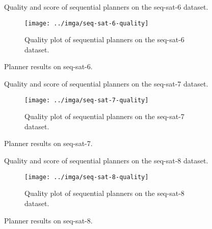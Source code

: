\begin{figure}[tbp]
\centering
\begin{subtable}{\textwidth}
\centering
\scriptsize
\renewcommand{\footnotesize}{\scriptsize}

\caption{Quality and score of sequential planners on the seq-sat-6 dataset.}
\label{tab:seq-sat-6-ipc-scores}
\end{subtable}

\vspace{0.5cm}
\begin{subfigure}{\textwidth}
\centering
\texttt{[image: ../imga/seq-sat-6-quality]}
\caption{Quality plot of sequential planners on the seq-sat-6 dataset.}
\label{fig:seq-sat-6-quality}
\end{subfigure}
\caption{Planner results on seq-sat-6.}
\label{fig:seq-sat-6-results}
\end{figure}

\begin{figure}[tbp]
\centering
\begin{subtable}{\textwidth}
\centering
\scriptsize
\renewcommand{\footnotesize}{\scriptsize}

\caption{Quality and score of sequential planners on the seq-sat-7 dataset.}
\label{tab:seq-sat-7-ipc-scores}
\end{subtable}

\vspace{0.5cm}
\begin{subfigure}{\textwidth}
\centering
\texttt{[image: ../imga/seq-sat-7-quality]}
\caption{Quality plot of sequential planners on the seq-sat-7 dataset.}
\label{fig:seq-sat-7-quality}
\end{subfigure}
\caption{Planner results on seq-sat-7.}
\label{fig:seq-sat-7-results}
\end{figure}

\begin{figure}[tbp]
\centering
\begin{subtable}{\textwidth}
\centering
\scriptsize
\renewcommand{\footnotesize}{\scriptsize}

\caption{Quality and score of sequential planners on the seq-sat-8 dataset.}
\label{tab:seq-sat-8-ipc-scores}
\end{subtable}

\vspace{0.5cm}
\begin{subfigure}{\textwidth}
\centering
\texttt{[image: ../imga/seq-sat-8-quality]}
\caption{Quality plot of sequential planners on the seq-sat-8 dataset.}
\label{fig:seq-sat-8-quality}
\end{subfigure}
\caption{Planner results on seq-sat-8.}
\label{fig:seq-sat-8-results}
\end{figure}



